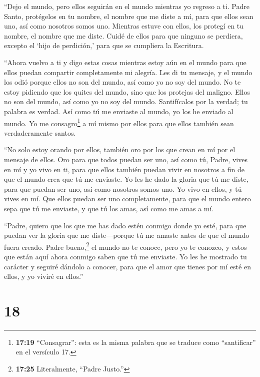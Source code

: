  ``Dejo el mundo, pero ellos seguirán en el mundo mientras
yo regreso a ti. Padre Santo, protégelos en tu nombre, el nombre que me
diste a mí, para que ellos sean uno, así como nosotros somos uno.
 Mientras estuve con ellos, los protegí en tu nombre, el
nombre que me diste. Cuidé de ellos para que ninguno se perdiera,
excepto el `hijo de perdición,' para que se cumpliera la Escritura.

 ``Ahora vuelvo a ti y digo estas cosas mientras estoy aún
en el mundo para que ellos puedan compartir completamente mi alegría.
 Les di tu mensaje, y el mundo los odió porque ellos no son
del mundo, así como yo no soy del mundo.  No te estoy
pidiendo que los quites del mundo, sino que los protejas del maligno.
 Ellos no son del mundo, así como yo no soy del mundo.
 Santifícalos por la verdad; tu palabra es verdad.
 Así como tú me enviaste al mundo, yo los he enviado al
mundo.  Yo me consagro\footnote{\textbf{17:19}
  ``Consagrar'': esta es la misma palabra que se traduce como
  ``santificar'' en el versículo 17.} a mí mismo por ellos para que
ellos también sean verdaderamente santos.

 ``No solo estoy orando por ellos, también oro por los que
crean en mí por el mensaje de ellos.  Oro para que todos
puedan ser uno, así como tú, Padre, vives en mí y yo vivo en ti, para
que ellos también puedan vivir en nosotros a fin de que el mundo crea
que tú me enviaste.  Yo les he dado la gloria que tú me
diste, para que puedan ser uno, así como nosotros somos uno.
 Yo vivo en ellos, y tú vives en mí. Que ellos puedan ser
uno completamente, para que el mundo entero sepa que tú me enviaste, y
que tú los amas, así como me amas a mí.

 ``Padre, quiero que los que me has dado estén conmigo
donde yo esté, para que puedan ver la gloria que me diste---porque tú me
amaste antes de que el mundo fuera creado.  Padre
bueno,\footnote{\textbf{17:25} Literalmente, ``Padre Justo.''} el mundo
no te conoce, pero yo te conozco, y estos que están aquí ahora conmigo
saben que tú me enviaste.  Yo les he mostrado tu carácter y
seguiré dándolo a conocer, para que el amor que tienes por mí esté en
ellos, y yo viviré en ellos.''

\hypertarget{section-17}{%
\section{18}\label{section-17}}


